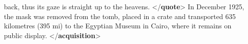 \begin{shaded}
\hspace*{1em}\hspace*{1em}\hspace*{1em}\hspace*{1em}\hspace*{1em}\hspace*{1em}\hspace*{1em}\hspace*{1em}\hspace*{1em}\hspace*{1em} back, thus its gaze is straight up to the heavens. {</\textbf{quote}>}\mbox{}\newline 
\hspace*{1em}\hspace*{1em}\hspace*{1em}\mbox{}\newline 
\hspace*{1em}\hspace*{1em}\mbox{}\newline 
\hspace*{1em}\hspace*{1em} In December 1925, the mask was removed from the tomb, placed in a crate and transported 635\mbox{}\newline 
\hspace*{1em}\hspace*{1em}\hspace*{1em}\hspace*{1em}\hspace*{1em}\hspace*{1em} kilometres (395 mi) to the Egyptian Museum in Cairo, where it remains on public display. {</\textbf{acquisition}>}\mbox{}\newline 
\hspace*{1em}\mbox{}\newline 
\hspace*{1em}\mbox{}\newline 
\hspace*{1em}\hspace*{1em}\mbox{}\newline 

\end{shaded}
